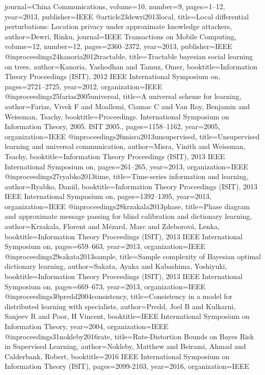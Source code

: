 {{{{{	journal={China Communications},
	volume={10},
	number={9},
	pages={1--12},
	year={2013},
	publisher={IEEE}
}
@article{23dewri2013local,
	title={Local differential perturbations: Location privacy under approximate knowledge attackers},
	author={Dewri, Rinku},
	journal={IEEE Transactions on Mobile Computing},
	volume={12},
	number={12},
	pages={2360--2372},
	year={2013},
	publisher={IEEE}
}
@inproceedings{24kanoria2012tractable,
	title={Tractable bayesian social learning on trees},
	author={Kanoria, Yashodhan and Tamuz, Omer},
	booktitle={Information Theory Proceedings (ISIT), 2012 IEEE International Symposium on},
	pages={2721--2725},
	year={2012},
	organization={IEEE}
}
@inproceedings{25farias2005universal,
	title={A universal scheme for learning},
	author={Farias, Vivek F and Moallemi, Ciamac C and Van Roy, Benjamin and Weissman, Tsachy},
	booktitle={Proceedings. International Symposium on Information Theory, 2005. ISIT 2005.},
	pages={1158--1162},
	year={2005},
	organization={IEEE}
}
@inproceedings{26misra2013unsupervised,
	title={Unsupervised learning and universal communication},
	author={Misra, Vinith and Weissman, Tsachy},
	booktitle={Information Theory Proceedings (ISIT), 2013 IEEE International Symposium on},
	pages={261--265},
	year={2013},
	organization={IEEE}
}
@inproceedings{27ryabko2013time,
	title={Time-series information and learning},
	author={Ryabko, Daniil},
	booktitle={Information Theory Proceedings (ISIT), 2013 IEEE International Symposium on},
	pages={1392--1395},
	year={2013},
	organization={IEEE}
}
@inproceedings{28krzakala2013phase,
	title={Phase diagram and approximate message passing for blind calibration and dictionary learning},
	author={Krzakala, Florent and M{\'e}zard, Marc and Zdeborov{\'a}, Lenka},
	booktitle={Information Theory Proceedings (ISIT), 2013 IEEE International Symposium on},
	pages={659--663},
	year={2013},
	organization={IEEE}
}
@inproceedings{29sakata2013sample,
	title={Sample complexity of Bayesian optimal dictionary learning},
	author={Sakata, Ayaka and Kabashima, Yoshiyuki},
	booktitle={Information Theory Proceedings (ISIT), 2013 IEEE International Symposium on},
	pages={669--673},
	year={2013},
	organization={IEEE}
}
@inproceedings{30predd2004consistency,
	title={Consistency in a model for distributed learning with specialists},
	author={Predd, Joel B and Kulkarni, Sanjeev R and Poor, H Vincent},
	booktitle={IEEE International Symposium on Information Theory},
	year={2004},
	organization={IEEE}
}
@inproceedings{31nokleby2016rate,
	title={Rate-Distortion Bounds on Bayes Risk in Supervised Learning},
	author={Nokleby, Matthew and Beirami, Ahmad and Calderbank, Robert},
	booktitle={2016 IEEE International Symposium on Information Theory (ISIT)},
	pages={2099-2103},
	year={2016},
	organization={IEEE}
}

}}}}
